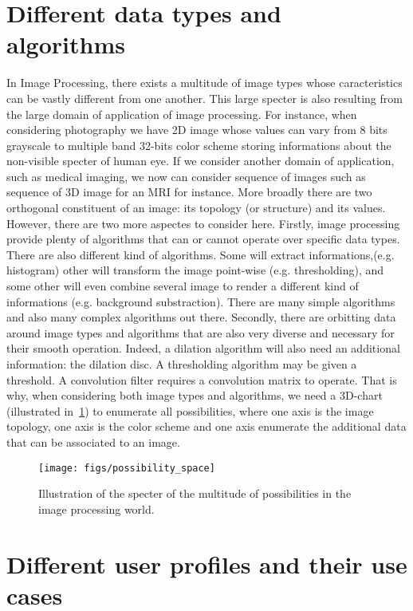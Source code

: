 \section*{Different data types and algorithms}

In Image Processing, there exists a multitude of image types whose caracteristics can be vastly different from one
another. This large specter is also resulting from the large domain of application of image processing. For instance,
when considering photography we have 2D image whose values can vary from 8 bits grayscale to multiple band 32-bits color
scheme storing informations about the non-visible specter of human eye. If we consider another domain of application,
such as medical imaging, we now can consider sequence of images such as sequence of 3D image for an MRI for instance.
More broadly there are two orthogonal constituent of an image: its topology (or structure) and its values. However,
there are two more aspectes to consider here. Firstly, image processing provide plenty of algorithms that can or cannot
operate over specific data types. There are also different kind of algorithms. Some will extract informations,(e.g.
histogram) other will transform the image point-wise (e.g. thresholding), and some other will even combine several image
to render a different kind of informations (e.g. background substraction). There are many simple algorithms and also
many complex algorithms out there. Secondly, there are orbitting data around image types and algorithms that are also
very diverse and necessary for their smooth operation. Indeed, a dilation algorithm will also need an additional
information: the dilation disc. A thresholding algorithm may be given a threshold. A convolution filter requires a
convolution matrix to operate. That is why, when considering both image types and algorithms, we need a 3D-chart
(illustrated in~\cref{fig.int.possibility_space}) to enumerate all possibilities, where one axis is the image topology,
one axis is the color scheme and one axis enumerate the additional data that can be associated to an image.


\begin{figure}[tbh]
  \centering
  \texttt{[image: figs/possibility\_space]}
  \caption{Illustration of the specter of the multitude of possibilities in the image processing world.}
  \label{fig.int.possibility_space}
\end{figure}


\section*{Different user profiles and their use cases}

